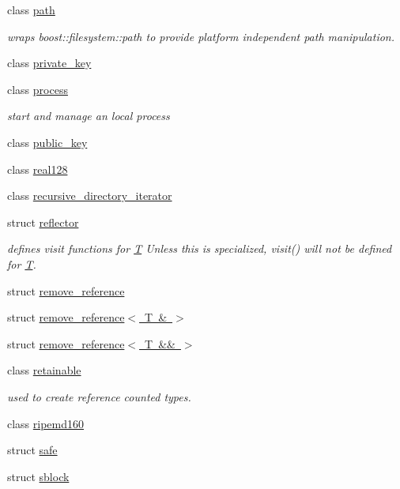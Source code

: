 \begin{DoxyCompactItemize}
class \mbox{\hyperlink{classfc_1_1path}{path}}
\begin{DoxyCompactList}\small\item\em wraps boost\+::filesystem\+::path to provide platform independent path manipulation. \end{DoxyCompactList}\item 
class \mbox{\hyperlink{classfc_1_1private__key}{private\+\_\+key}}
\item 
class \mbox{\hyperlink{classfc_1_1process}{process}}
\begin{DoxyCompactList}\small\item\em start and manage an local process \end{DoxyCompactList}\item 
class \mbox{\hyperlink{classfc_1_1public__key}{public\+\_\+key}}
\item 
class \mbox{\hyperlink{classfc_1_1real128}{real128}}
\item 
class \mbox{\hyperlink{classfc_1_1recursive__directory__iterator}{recursive\+\_\+directory\+\_\+iterator}}
\item 
struct \mbox{\hyperlink{structfc_1_1reflector}{reflector}}
\begin{DoxyCompactList}\small\item\em defines visit functions for \mbox{\hyperlink{struct_t}{T}} Unless this is specialized, visit() will not be defined for \mbox{\hyperlink{struct_t}{T}}. \end{DoxyCompactList}\item 
struct \mbox{\hyperlink{structfc_1_1remove__reference}{remove\+\_\+reference}}
\item 
struct \mbox{\hyperlink{structfc_1_1remove__reference_3_01_t_01_6_01_4}{remove\+\_\+reference$<$ T \& $>$}}
\item 
struct \mbox{\hyperlink{structfc_1_1remove__reference_3_01_t_01_6_6_01_4}{remove\+\_\+reference$<$ T \&\& $>$}}
\item 
class \mbox{\hyperlink{classfc_1_1retainable}{retainable}}
\begin{DoxyCompactList}\small\item\em used to create reference counted types. \end{DoxyCompactList}\item 
class \mbox{\hyperlink{classfc_1_1ripemd160}{ripemd160}}
\item 
struct \mbox{\hyperlink{structfc_1_1safe}{safe}}
\item 
struct \mbox{\hyperlink{structfc_1_1sblock}{sblock}}

\end{DoxyCompactItemize}
